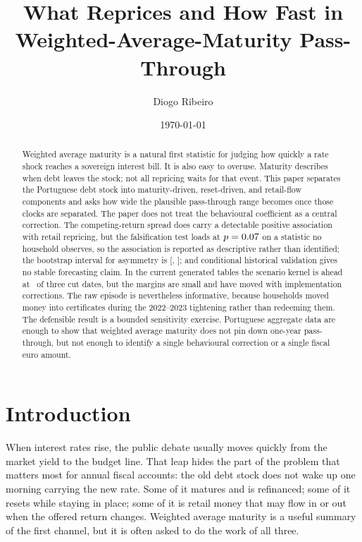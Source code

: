 \documentclass[11pt,a4paper]{article}
\title{\textbf{What Reprices and How Fast in Weighted-Average-Maturity
Pass-Through}}
\author{Diogo Ribeiro}
\date{\today}
\begin{document}
\maketitle

\begin{abstract}
Weighted average maturity is a natural first statistic for judging how quickly
a rate shock reaches a sovereign interest bill. It is also easy to overuse.
Maturity describes when debt leaves the stock; not all repricing waits for that
event. This paper separates the Portuguese debt stock into maturity-driven,
reset-driven, and retail-flow components and asks how wide the plausible
pass-through range becomes once those clocks are separated. The paper does not
treat the behavioural coefficient as a central correction. The competing-return
spread does carry a detectable positive association with retail repricing, but
the falsification test loads at $p = 0.07$ on a statistic no household
observes, so the association is reported as descriptive rather than identified;
the bootstrap interval for asymmetry is [\AsymmetryLow, \AsymmetryHigh]; and
conditional historical validation gives no stable forecasting claim. In the
current generated tables the scenario kernel is ahead at
\BacktestScenarioWins\ of three cut dates, but the margins are small and have
moved with implementation corrections. The raw episode is nevertheless
informative, because households moved money into certificates during the
2022--2023 tightening rather than redeeming them. The defensible result is a
bounded sensitivity exercise. Portuguese aggregate data are enough to show
that weighted average maturity does not pin down one-year pass-through, but
not enough to identify a single behavioural correction or a single fiscal euro
amount.
\end{abstract}

\section{Introduction}
\label{sec:introduction}

When interest rates rise, the public debate usually moves quickly from the
market yield to the budget line. That leap hides the part of the problem that
matters most for annual fiscal accounts: the old debt stock does not wake up
one morning carrying the new rate. Some of it matures and is refinanced; some
of it resets while staying in place; some of it is retail money that may flow
in or out when the offered return changes. Weighted average maturity is a useful
summary of the first channel, but it is often asked to do the work of all
three.
\end{document}
